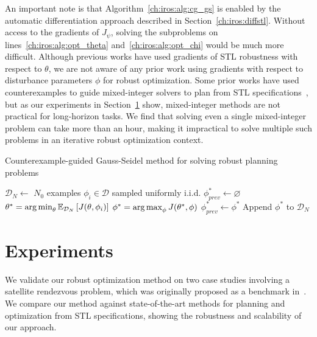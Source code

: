 An important note is that Algorithm~\ref{ch:iros:alg:cg_gs} is enabled by the automatic differentiation approach described in Section~\ref{ch:iros:diffstl}. Without access to the gradients of $J_\psi$, solving the subproblems on lines~\ref{ch:iros:alg:opt_theta} and~\ref{ch:iros:alg:opt_chi} would be much more difficult. Although previous works have used gradients of STL robustness with respect to $\theta$, we are not aware of any prior work using gradients with respect to disturbance parameters $\phi$ for robust optimization. Some prior works have used counterexamples to guide mixed-integer solvers to plan from STL specifications~\cite{raman15}, but as our experiments in Section~\ref{ch:iros:experiments} show, mixed-integer methods are not practical for long-horizon tasks. We find that solving even a single mixed-integer problem can take more than an hour, making it impractical to solve multiple such problems in an iterative robust optimization context.

\begin{algorithm}
	\caption{Counterexample-guided Gauss-Seidel method for solving robust planning problems}\label{ch:iros:alg:cg_gs}
	\DontPrintSemicolon
	$\mathcal{D}_N \gets $ $N_0$ examples $\phi_i \in \mathcal{D}$ sampled uniformly i.i.d.\;
	$\phi^*_{prev} \gets \varnothing$\;
	{
	$\theta^* = \operatorname*{arg\,min}_\theta \mathbb{E}_{\mathcal{D}_N} \left[ J(\theta, \phi_i) \right] \label{ch:iros:alg:opt_theta}$ \;
	$\phi^* = \operatorname*{arg\,max}_\phi J(\theta^*, \phi)$ \label{ch:iros:alg:opt_chi} \;
	$\phi^*_{prev} \gets \phi^*$\;
	Append $\phi^*$ to $\mathcal{D}_N$\;
	}
\end{algorithm}

\section{Experiments}\label{ch:iros:experiments}

We validate our robust optimization method on two case studies involving a satellite rendezvous problem, which was originally proposed as a benchmark in~\cite{jewisonSpacecraftBenchmarkProblem2016}. We compare our method against state-of-the-art methods for planning and optimization from STL specifications, showing the robustness and scalability of our approach.

